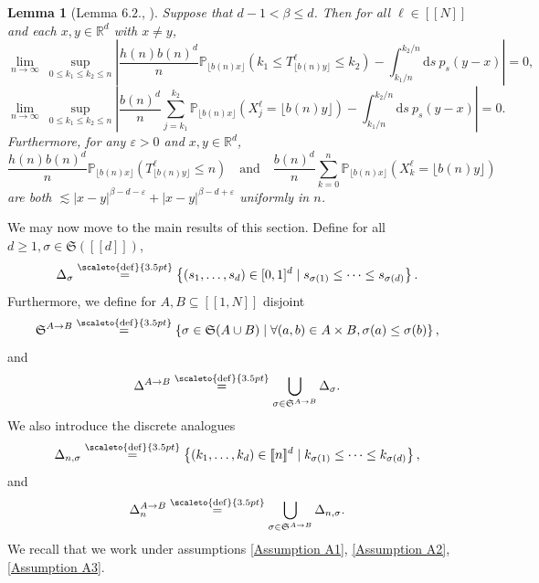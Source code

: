 \documentclass[12pt]{article}
\newcommand{\RR}{\mathbb R}
\newcommand{\PP}{\mathbb P}
\newcommand{\1}{\mathds{1}}
\renewcommand{\d}{\mathrm d}
\newcommand{\eqdef}{\stackrel{\scaleto{\mathrm{def}}{3.5pt}}{=}}
\newtheorem{lemma}{Lemma}
\numberwithin{equation}{section}
\begin{document}
\begin{lemma}[Lemma $6.2.$, \cite{LeGallRosenRangeOfStableRandomWalks1991}]
\label{lemma:uniform convergence of hitting times}
    Suppose that $d-1<\beta\le d$. Then for all $\ell\in[\![N]\!]$ and each $x,y\in\RR^d$ with $x\neq y$,
    \begin{equation}
    \label{limit:uniform convergence discrete -> continuous I}
        \underset{n\rightarrow\infty}\lim\ \underset{0\le k_1\le k_2\le n}\sup\left|\frac{h(n)b(n)^d}{n}\PP_{\lfloor b(n) x\rfloor}\left(k_1\le T_{\lfloor b(n) y\rfloor}^\ell\le k_2\right)-\int_{k_1/n}^{k_2/n}\d s\ p_s(y-x)\right|=0,
    \end{equation}
    \begin{equation}
    \label{limit:uniform convergence discrete -> continuous II}
        \underset{n\rightarrow\infty}\lim\ \underset{0\le k_1\le k_2\le n}\sup\left|\frac{b(n)^d}{n}\sum_{j=k_1}^{k_2}\PP_{\lfloor b(n)x\rfloor}\left(X_j^\ell=\lfloor b(n) y\rfloor\right)-\int_{k_1/n}^{k_2/n}\d s\ p_s(y-x)\right|=0.
    \end{equation}
    Furthermore, for any $\varepsilon>0$ and $x,y\in\RR^d$,
    \begin{equation}
    \label{ineq:bound for dominated convergence theorem}
       \frac{h(n)b(n)^d}{n}\PP_{\lfloor b(n)x\rfloor}\left(T_{\lfloor b(n) y\rfloor}^\ell\le n\right)\quad\text{and}\quad\frac{b(n)^d}{n}\sum_{k=0}^n\PP_{\lfloor b(n)x\rfloor}\left(X_k^\ell=\lfloor b(n) y\rfloor\right)
    \end{equation}
    are both $\lesssim|x-y|^{\beta-d-\varepsilon}+|x-y|^{\beta-d+\varepsilon}$ uniformly in $n$.
\end{lemma}

We may now move to the main results of this section. Define for all $d\ge1, \sigma\in\mathfrak S([\![d]\!])$,
\begin{equation*}
    \Delta_\sigma\eqdef\left\{(s_1,\dots, s_d)\in[0,1]^d\mid s_{\sigma(1)}\le\dots\le s_{\sigma(d)}\right\}.
\end{equation*}
Furthermore, we define for $A,B\subseteq[\![1,N]\!]$ disjoint
\begin{equation*}
    \mathfrak S^{A\rightarrow B}\eqdef\left\{\sigma\in\mathfrak S(A\cup B)\mid \forall (a,b)\in A\times B,\sigma(a)\le\sigma(b)\right\},
\end{equation*}
and
\begin{equation*}
    \Delta^{A\rightarrow B}\eqdef\bigcup_{\sigma\in\mathfrak S^{A\rightarrow B}}\Delta_\sigma.
\end{equation*}
We also introduce the discrete analogues
\begin{equation*}
    \Delta_{n,\sigma}\eqdef\left\{(k_1,\dots, k_d)\in[\![n]\!]^d\mid k_{\sigma(1)}\le\dots\le k_{\sigma(d)}\right\},
\end{equation*}
and
\begin{equation*}
    \Delta_n^{A\rightarrow B}\eqdef\bigcup_{\sigma\in\mathfrak S^{A\rightarrow B}}\Delta_{n,\sigma}.
\end{equation*}
We recall that we work under assumptions \ref{Assumption A1}, \ref{Assumption A2}, \ref{Assumption A3}.
\end{document}
